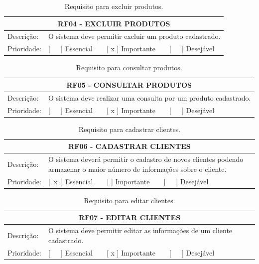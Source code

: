 \begin{anexosenv}
\begin{table}[htbp]
\centering
\caption{Requisito para excluir produtos.}
\label{tab:rf04}
\begin{tabular}{l p{10cm}}
\toprule
\multicolumn{2}{c}{RF04 - EXCLUIR PRODUTOS} \\ \midrule
Descrição:  & O sistema deve permitir excluir um produto cadastrado.\\ \midrule
Prioridade: & [   ] Essencial    [ x ] Importante    [   ] Desejável \\ \bottomrule
\end{tabular}
\end{table}

\begin{table}[H]
\centering
\caption{Requisito para consultar produtos.}
\label{tab:rf05}
\begin{tabular}{l p{10cm}}
\toprule
\multicolumn{2}{c}{RF05 - CONSULTAR PRODUTOS} \\ \midrule
Descrição:  & O sistema deve realizar uma consulta por um produto cadastrado.\\ \midrule
Prioridade: & [   ] Essencial    [ x ] Importante    [   ] Desejável \\ \bottomrule
\end{tabular}
\end{table}

\begin{table}[htbp]
\centering
\caption{Requisito para cadastrar clientes.}
\label{tab:rf06}
\begin{tabular}{l p{10cm}}
\toprule
\multicolumn{2}{c}{RF06 - CADASTRAR CLIENTES} \\ \midrule
Descrição:  & O sistema deverá permitir o cadastro de novos clientes podendo armazenar o maior número de informações sobre o cliente.\\ \midrule
Prioridade: & [ x ] Essencial    [   ] Importante    [   ] Desejável \\ \bottomrule
\end{tabular}
\end{table}

\begin{table}[htbp]
\centering
\caption{Requisito para editar clientes.}
\label{tab:rf07}
\begin{tabular}{l p{10cm}}
\toprule
\multicolumn{2}{c}{RF07 - EDITAR CLIENTES} \\ \midrule
Descrição:  & O sistema deve permitir editar as informações de um cliente cadastrado.\\ \midrule
Prioridade: & [   ] Essencial    [ x ] Importante    [   ] Desejável \\ \bottomrule
\end{tabular}
\end{table}


\end{anexosenv}
